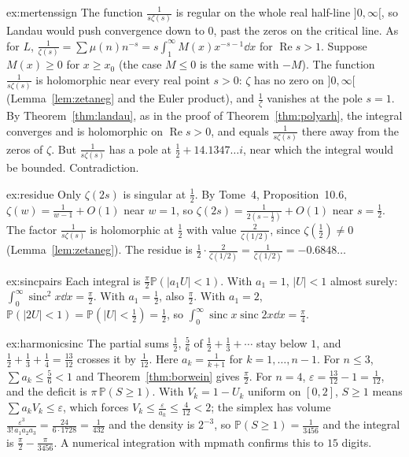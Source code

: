 \begin{solution}{ex:mertenssign}
\idea The function $\frac1{s\zeta(s)}$ is regular on the whole real half-line $]0,\infty[$, so Landau would push convergence down to $0$, past the zeros on the
critical line.
\writeup As for $L$, $\frac1{\zeta(s)}=\sum\mu(n)n^{-s}=s\int_1^\infty M(x)x^{-s-1}\dd x$ for $\operatorname{Re}s>1$. Suppose $M(x)\ge0$ for $x\ge x_0$ (the case
$M\le0$ is the same with $-M$). The function $\frac1{s\zeta(s)}$ is holomorphic near every real point $s>0$: $\zeta$ has no zero on $]0,\infty[$ (Lemma~\ref{lem:zetaneg}
and the Euler product), and $\frac1\zeta$ vanishes at the pole $s=1$. By Theorem~\ref{thm:landau}, as in the proof of Theorem~\ref{thm:polyarh}, the integral
converges and is holomorphic on $\operatorname{Re}s>0$, and equals $\frac1{s\zeta(s)}$ there away from the zeros of $\zeta$. But $\frac1{s\zeta(s)}$ has a pole at
$\frac12+14.1347\ldots i$, near which the integral would be bounded. Contradiction.
\end{solution}

\begin{solution}{ex:residue}
\idea Only $\zeta(2s)$ is singular at $\frac12$.
\writeup By Tome~4, Proposition~10.6, $\zeta(w)=\frac1{w-1}+O(1)$ near $w=1$, so $\zeta(2s)=\frac1{2(s-\frac12)}+O(1)$ near $s=\frac12$. The factor $\frac1{s\zeta(s)}$
is holomorphic at $\frac12$ with value $\frac2{\zeta(1/2)}$, since $\zeta(\frac12)\ne0$ (Lemma~\ref{lem:zetaneg}). The residue is $\frac12\cdot\frac2{\zeta(1/2)}=\frac1{\zeta(1/2)}=-0.6848\ldots$
\end{solution}

\begin{solution}{ex:sincpairs}
\idea Each integral is $\frac\pi2\mathbb P(|a_1U|<1)$.
\writeup With $a_1=1$, $|U|<1$ almost surely: $\int_0^\infty\operatorname{sinc}^2x\dd x=\frac\pi2$. With $a_1=\frac12$, also $\frac\pi2$. With $a_1=2$,
$\mathbb P(|2U|<1)=\mathbb P(|U|<\frac12)=\frac12$, so $\int_0^\infty\operatorname{sinc}x\operatorname{sinc}2x\dd x=\frac\pi4$.
\end{solution}

\begin{solution}{ex:harmonicsinc}
\idea The partial sums $\frac12$, $\frac56$ of $\frac12+\frac13+\cdots$ stay below $1$, and $\frac12+\frac13+\frac14=\frac{13}{12}$ crosses it by $\frac1{12}$.
\writeup Here $a_k=\frac1{k+1}$ for $k=1,\dots,n-1$. For $n\le3$, $\sum a_k\le\frac56<1$ and Theorem~\ref{thm:borwein} gives $\frac\pi2$. For $n=4$,
$\varepsilon=\frac{13}{12}-1=\frac1{12}$, and the deficit is $\pi\,\mathbb P(S\ge1)$. With $V_k=1-U_k$ uniform on $[0,2]$, $S\ge1$ means $\sum a_kV_k\le\varepsilon$,
which forces $V_k\le\frac\varepsilon{a_k}\le\frac4{12}<2$; the simplex has volume $\frac{\varepsilon^3}{3!\,a_1a_2a_3}=\frac{24}{6\cdot1728}=\frac1{432}$ and the density is
$2^{-3}$, so $\mathbb P(S\ge1)=\frac1{3456}$ and the integral is $\frac\pi2-\frac\pi{3456}$. A numerical integration with mpmath confirms this to $15$ digits.
\end{solution}

